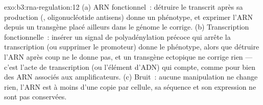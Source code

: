 \begin{solution}{exo:b3:rna-regulation:12}
(a) ARN fonctionnel~: détruire le transcrit après sa production (,
oligonucléotide antisens) donne un phénotype, et exprimer l'ARN depuis
un transgène placé ailleurs dans le génome le corrige. (b)
Transcription fonctionnelle~: insérer un signal de polyadénylation
précoce qui arrête la transcription (ou supprimer le promoteur) donne
le phénotype, alors que détruire l'ARN après coup ne le donne pas, et
un transgène ectopique ne corrige rien --- c'est l'acte de
transcription (ou l'élément d'ADN) qui compte, comme pour bien des ARN
associés aux amplificateurs. (c) Bruit~: aucune manipulation ne change
rien, l'ARN est à moins d'une copie par cellule, sa séquence et son
expression ne sont pas conservées.
\end{solution}

